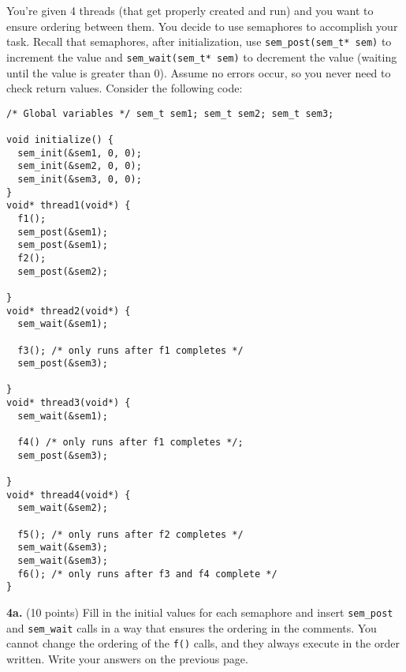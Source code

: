 \documentclass[12pt]{article}
\begin{document}
\vspace{1em}

You're given 4 threads (that get properly created and run) and you want to
ensure ordering between them.
You decide to use semaphores to accomplish your task.
Recall that semaphores, after initialization, use
\texttt{sem\_post(sem\_t* sem)} to increment the value and
\texttt{sem\_wait(sem\_t* sem)} to decrement the value (waiting until the value
is greater than 0).
Assume no errors occur, so you never need to check return values.
Consider the following code:

  \begin{lstlisting}
/* Global variables */ sem_t sem1; sem_t sem2; sem_t sem3;

void initialize() {
  sem_init(&sem1, 0, 0);
  sem_init(&sem2, 0, 0);
  sem_init(&sem3, 0, 0);
}
void* thread1(void*) {
  f1();
  sem_post(&sem1);
  sem_post(&sem1);
  f2();
  sem_post(&sem2);

}
void* thread2(void*) {
  sem_wait(&sem1);

  f3(); /* only runs after f1 completes */
  sem_post(&sem3);

}
void* thread3(void*) {
  sem_wait(&sem1);

  f4() /* only runs after f1 completes */;
  sem_post(&sem3);

}
void* thread4(void*) {
  sem_wait(&sem2);

  f5(); /* only runs after f2 completes */
  sem_wait(&sem3);
  sem_wait(&sem3);
  f6(); /* only runs after f3 and f4 complete */
}
  \end{lstlisting}
% 
% 
% 
% 
% 
% 
% 
% 
% 
% 
% 
% 
% 
% 
% 
% 
% 

\newpage

\textbf{4a.} (10 points) Fill in the initial values for each semaphore and
insert \texttt{sem\_post} and \texttt{sem\_wait} calls in a way that ensures
the ordering in the comments.
You cannot change the ordering of the \texttt{f()} calls, and they always
execute in the order written.
Write your answers on the previous page.
\end{document}
